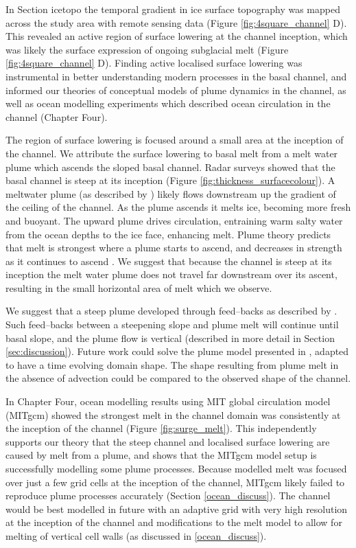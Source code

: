In Section icetopo the temporal gradient in ice surface topography was mapped across the study area with remote sensing data (Figure \ref{fig:4square_channel} D). This revealed an active region of surface lowering at the channel inception, which was likely the surface expression of ongoing subglacial melt (Figure \ref{fig:4square_channel} D).  
Finding active localised surface lowering was instrumental in better understanding modern processes in the basal channel, and informed our theories of conceptual models of plume dynamics in the channel, as well as ocean modelling experiments which described ocean circulation in the channel (Chapter Four). 

The region of surface lowering is focused around a small area at the inception of the channel. We attribute the surface lowering to basal melt from a melt water plume which ascends the sloped basal channel. Radar surveys showed that the basal channel is steep at its inception (Figure \ref{fig:thickness_surfacecolour}). A meltwater plume (as described by \cite{jenkins1991one}) likely flows downstream up the gradient of the ceiling of the channel. As the plume ascends it melts ice, becoming more fresh and buoyant. The upward plume drives circulation, entraining warm salty water from the ocean depths to the ice face, enhancing melt.  Plume theory predicts that melt is strongest where a plume starts to ascend, and decreases in strength as it continues to ascend \citep{jenkins1991one}. We suggest that because the channel is steep at its inception the melt water plume does not travel far downstream over its ascent, resulting in the small horizontal area of melt which we observe. 

We suggest that a steep plume developed through feed--backs as described by \cite{sergienko2013basal}. Such feed--backs between a steepening slope and plume melt will continue until basal slope, and the plume flow is vertical (described in more detail in Section \ref{sec:discussion}).    
Future work could solve the plume model presented in \cite{jenkins2011convection}, adapted to have a time evolving domain shape. The shape resulting from plume melt in the absence of advection could be compared to the observed shape of the channel. 

In Chapter Four, ocean modelling results using MIT global circulation model (MITgcm) showed the strongest melt in the channel domain was consistently at the inception of the channel (Figure \ref{fig:surge_melt}). This independently supports our theory that the steep channel and localised surface lowering are caused by melt from a plume, and shows that the MITgcm model setup is successfully modelling some plume processes.
Because modelled melt was focused over just a few grid cells at the inception of the channel,  MITgcm likely failed to reproduce plume processes accurately (Section \ref{ocean_discuss}). The channel would be best modelled in future with an adaptive grid with very high resolution at the inception of the channel and modifications to the melt model to allow for melting of vertical cell walls (as discussed in \ref{ocean_discuss}).

